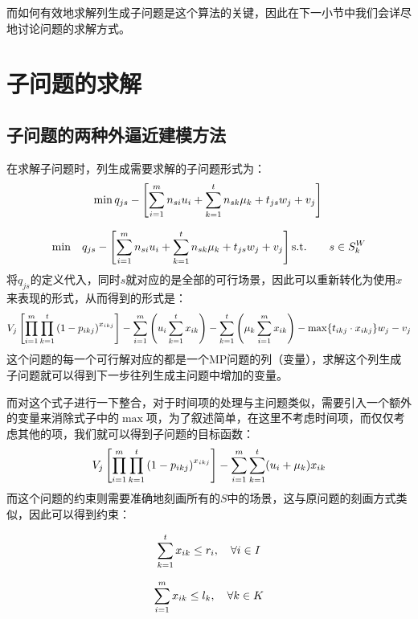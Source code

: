 而如何有效地求解列生成子问题是这个算法的关键，因此在下一小节中我们会详尽地讨论问题的求解方式。
\section{子问题的求解}
\subsection{子问题的两种外逼近建模方法}
在求解子问题时，列生成需要求解的子问题形式为：
\begin{equation*}
    \min q_{js} - \left[ \sum_{i=1}^{m} n_{si}u_i + \sum_{k=1}^{t} n_{sk}\mu_k + t_{js} w_j + v_j \right] 
    \text{}
\end{equation*}

\begin{align*}
    \min \quad & q_{js} - \left[ \sum_{i=1}^{m} n_{si}u_i + \sum_{k=1}^{t} n_{sk}\mu_k + t_{js} w_j + v_j \right] 
    \text{s.t.} \quad & s \in S_k^W
\end{align*}
将$q_{js}$的定义代入，同时$s$就对应的是全部的可行场景，因此可以重新转化为使用$x$来表现的形式，从而得到的形式是：
\begin{equation*}
    V_j\left[ \prod_{i=1}^{m}{\prod_{k=1}^{t}{\left( 1-p_{ikj} \right) ^{x_{ikj}}}} \right] -\sum_{i=1}^{m} \left( u_i\sum_{k=1}^{t} x_{ik} \right)  - \sum_{k=1}^{t} \left( \mu_k\sum_{i=1}^{m} x_{ik} \right)  - \max\{t_{ikj} \cdot x_{ikj}\} w_j - v_j
\end{equation*}
这个问题的每一个可行解对应的都是一个MP问题的列（变量），求解这个列生成子问题就可以得到下一步往列生成主问题中增加的变量。

而对这个式子进行一下整合，对于时间项的处理与主问题类似，需要引入一个额外的变量来消除式子中的$\max$项，为了叙述简单，在这里不考虑时间项，而仅仅考虑其他的项，我们就可以得到子问题的目标函数：
\begin{equation*}
    V_j\left[ \prod_{i=1}^{m}{\prod_{k=1}^{t}{\left( 1-p_{ikj} \right) ^{x_{ikj}}}} \right] - \sum_{i=1}^{m} \sum_{k=1}^{t} (u_i + \mu_k)x_{ik}
\end{equation*}
而这个问题的约束则需要准确地刻画所有的$S$中的场景，这与原问题的刻画方式类似，因此可以得到约束：

\begin{equation*}
    \sum_{k=1}^{t} x_{ik}\leq r_i, \quad \forall i \in I
\end{equation*}

\begin{equation*}
    \sum_{i=1}^{m} x_{ik}\leq l_k, \quad \forall k \in K
\end{equation*}

